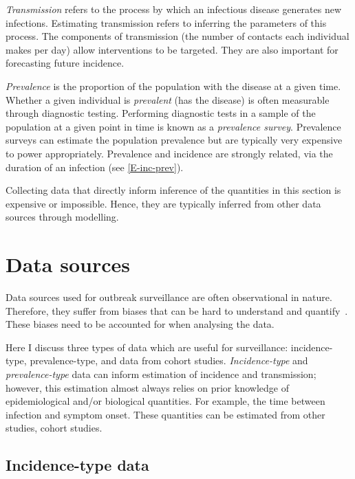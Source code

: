 \documentclass[thesis.tex]{subfiles}
\begin{document}
\emph{Transmission} refers to the process by which an infectious disease generates new infections.
Estimating transmission refers to inferring the parameters of this process.
The components of transmission (\eg the number of contacts each individual makes per day) allow interventions to be targeted.
They are also important for forecasting future incidence.

\emph{Prevalence} is the proportion of the population with the disease at a given time.
Whether a given individual is \emph{prevalent} (has the disease) is often measurable through diagnostic testing.
Performing diagnostic tests in a sample of the population at a given point in time is known as a \emph{prevalence survey}.
Prevalence surveys can estimate the population prevalence but are typically very expensive to power appropriately.
Prevalence and incidence are strongly related, via the duration of an infection (see \cref{E-inc-prev}).


Collecting data that directly inform inference of the quantities in this section is expensive or impossible.
Hence, they are typically inferred from other data sources through modelling.

\section{Data sources}

Data sources used for outbreak surveillance are often observational in nature.
Therefore, they suffer from biases that can be hard to understand and quantify~\autocite{shadboltChallenges}.
These biases need to be accounted for when analysing the data.

Here I discuss three types of data which are useful for surveillance: incidence-type, prevalence-type, and data from cohort studies.
\emph{Incidence-type} and \emph{prevalence-type} data can inform estimation of incidence and transmission; however, this estimation almost always relies on prior knowledge of epidemiological and/or biological quantities.
For example, the time between infection and symptom onset.
These quantities can be estimated from other studies, \eg cohort studies.

\subsection{Incidence-type data}
\end{document}
